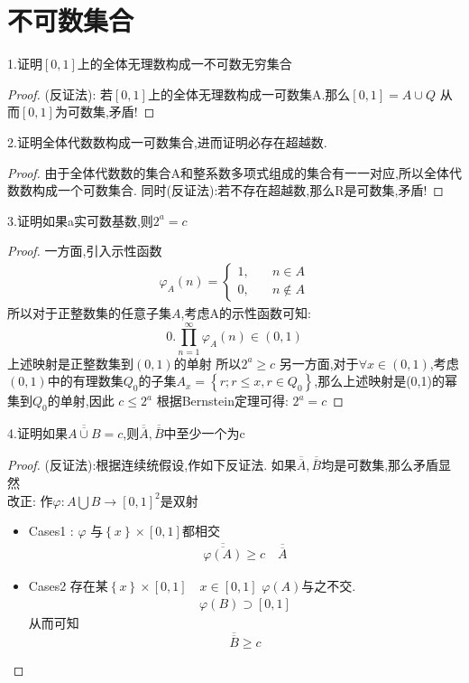 \section{不可数集合}
1.证明\([0,1]\)上的全体无理数构成一不可数无穷集合
\begin{proof}
   (反证法):  若\([0,1]\)上的全体无理数构成一可数集A.那么\([0,1] = A\cup Q \) 从而\([0,1]\)为可数集,矛盾!
\end{proof}
2.证明全体代数数构成一可数集合,进而证明必存在超越数.
\begin{proof}
    由于全体代数数的集合A和整系数多项式组成的集合有一一对应,所以全体代数数构成一个可数集合.
    同时(反证法):若不存在超越数,那么R是可数集,矛盾!
\end{proof}
3.证明如果a实可数基数,则\(2^a =c\)
\begin{proof}
    一方面,引入示性函数
    \begin{align}\label{示性函数}
        \varphi_{A}(n)=\begin{cases}
            1, \quad&n\in A\\ 
            0,\quad &n \notin A
        \end{cases}
    \end{align}
    所以对于正整数集的任意子集\(A\),考虑A的示性函数可知:
    \[0.\prod_{n=1}^{\infty}\varphi_A (n) \in (0,1)\] 
    上述映射是正整数集到\((0,1)\)的单射
    所以\(2^a \geq c\)
    另一方面,对于\(\forall x \in (0,1)\),考虑\((0,1)\)中的有理数集\(Q_0\)的子集\(A_x=\left\{r;r\leq x , r\in Q_0 \right\}\),那么上述映射是(0,1)的幂集到\(Q_0\)的单射,因此 \(c \leq 2^a\)
    根据Bernstein定理可得: \(2^a = c\)
\end{proof}
4.证明如果\(\overline{\overline{A \cup B}} =c\),则\(\overline{\overline{A}},\overline{\overline{B}}\)中至少一个为c
\begin{proof}
    (反证法):根据连续统假设,作如下反证法. 如果\(\overline{\overline{A}},\overline{\overline{B}}\)均是可数集,那么矛盾显然
    \\ 
    改正: 作\(\varphi: A\bigcup B \rightarrow [0,1]^2 \)是双射 
    \begin{itemize}
      \item Cases1 : \(\varphi \) 与\(\left\{x\right\}\times[0,1]\)都相交 \begin{align*}
          \overline{\overline{\varphi(A)}} \geq c \quad \overline{\overline{A}}
      \end{align*}
        \item Cases2 存在某\(\left\{x\right\}\times[0,1]\quad x \in [0,1]\) \(\varphi(A)\)与之不交.      
          \begin{align*}
            \varphi(B) \supset [0,1]
          \end{align*}
          从而可知\[\overline{\overline{B}} \geq c\]
    \end{itemize}
\end{proof}
